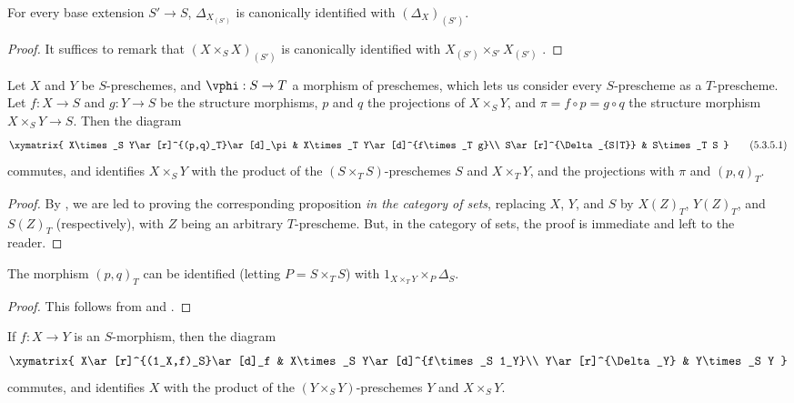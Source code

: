 \begin{env}
\label{I.5.3.3}
\end{env}

\begin{corollary}[5.3.4]
\label{I.5.3.4}
For every base extension $S'\to S$, $\Delta_{X_{(S')}}$ is canonically identified with $(\Delta_X)_{(S')}$.
\end{corollary}

\begin{proof}
It suffices to remark that $(X\times_S X)_{(S')}$ is canonically identified with $X_{(S')}\times_{S'}X_{(S')}$ .
\end{proof}

\begin{proposition}[5.3.5]
\label{I.5.3.5}
Let $X$ and $Y$ be $S$-preschemes, and $\vphi:S\to T$ a morphism of preschemes, which lets us consider every $S$-prescheme as a $T$-prescheme.
Let $f:X\to S$ and $g:Y\to S$ be the structure morphisms, $p$ and $q$ the projections of $X\times_S Y$, and $\pi=f\circ p=g\circ q$ the structure morphism $X\times_S Y\to S$.
Then the diagram
\[
\label{I.5.3.5.1}
  \xymatrix{
    X\times_S Y\ar[r]^{(p,q)_T}\ar[d]_\pi &
    X\times_T Y\ar[d]^{f\times_T g}\\
    S\ar[r]^{\Delta_{S|T}} &
    S\times_T S
  }
  \tag{5.3.5.1}
\]
commutes, and identifies $X\times_S Y$ with the product of the $(S\times_T S)$-preschemes $S$ and $X\times_T Y$, and the projections with $\pi$ and $(p,q)_T$.
\end{proposition}

\begin{proof}
By , we are led to proving the corresponding proposition \emph{in the category of sets}, replacing $X$, $Y$, and $S$ by $X(Z)_T$, $Y(Z)_T$, and $S(Z)_T$ (respectively), with $Z$ being an arbitrary $T$-prescheme.
But, in the category of sets, the proof is immediate and left to the reader.
\end{proof}

\begin{corollary}[5.3.6]
\label{I.5.3.6}
The morphism $(p,q)_T$ can be identified (letting $P=S\times_T S$) with $1_{X\times_T Y}\times_P\Delta_S$.
\end{corollary}

\begin{proof}
This follows from  and .
\end{proof}

\begin{corollary}[5.3.7]
\label{I.5.3.7}
If $f:X\to Y$ is an $S$-morphism, then the diagram
\[
  \xymatrix{
    X\ar[r]^{(1_X,f)_S}\ar[d]_f &
    X\times_S Y\ar[d]^{f\times_S 1_Y}\\
    Y\ar[r]^{\Delta_Y} &
    Y\times_S Y
  }
\]
commutes, and identifies $X$ with the product of the $(Y\times_S Y)$-preschemes $Y$ and $X\times_S Y$.
\end{corollary}

